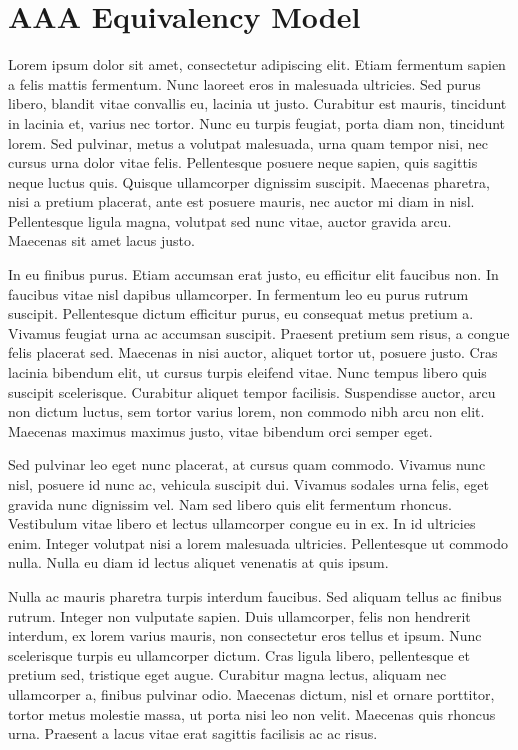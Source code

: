 \section{AAA Equivalency Model}
\label{sec:aaa_equivalency}

Lorem ipsum dolor sit amet, consectetur adipiscing elit. Etiam fermentum sapien a felis mattis fermentum. Nunc laoreet eros in malesuada ultricies. Sed purus libero, blandit vitae convallis eu, lacinia ut justo. Curabitur est mauris, tincidunt in lacinia et, varius nec tortor. Nunc eu turpis feugiat, porta diam non, tincidunt lorem. Sed pulvinar, metus a volutpat malesuada, urna quam tempor nisi, nec cursus urna dolor vitae felis. Pellentesque posuere neque sapien, quis sagittis neque luctus quis. Quisque ullamcorper dignissim suscipit. Maecenas pharetra, nisi a pretium placerat, ante est posuere mauris, nec auctor mi diam in nisl. Pellentesque ligula magna, volutpat sed nunc vitae, auctor gravida arcu. Maecenas sit amet lacus justo.

\vspace{2mm}

In eu finibus purus. Etiam accumsan erat justo, eu efficitur elit faucibus non. In faucibus vitae nisl dapibus ullamcorper. In fermentum leo eu purus rutrum suscipit. Pellentesque dictum efficitur purus, eu consequat metus pretium a. Vivamus feugiat urna ac accumsan suscipit. Praesent pretium sem risus, a congue felis placerat sed. Maecenas in nisi auctor, aliquet tortor ut, posuere justo. Cras lacinia bibendum elit, ut cursus turpis eleifend vitae. Nunc tempus libero quis suscipit scelerisque. Curabitur aliquet tempor facilisis. Suspendisse auctor, arcu non dictum luctus, sem tortor varius lorem, non commodo nibh arcu non elit. Maecenas maximus maximus justo, vitae bibendum orci semper eget.

\vspace{2mm}

Sed pulvinar leo eget nunc placerat, at cursus quam commodo. Vivamus nunc nisl, posuere id nunc ac, vehicula suscipit dui. Vivamus sodales urna felis, eget gravida nunc dignissim vel. Nam sed libero quis elit fermentum rhoncus. Vestibulum vitae libero et lectus ullamcorper congue eu in ex. In id ultricies enim. Integer volutpat nisi a lorem malesuada ultricies. Pellentesque ut commodo nulla. Nulla eu diam id lectus aliquet venenatis at quis ipsum.

\vspace{2mm}

Nulla ac mauris pharetra turpis interdum faucibus. Sed aliquam tellus ac finibus rutrum. Integer non vulputate sapien. Duis ullamcorper, felis non hendrerit interdum, ex lorem varius mauris, non consectetur eros tellus et ipsum. Nunc scelerisque turpis eu ullamcorper dictum. Cras ligula libero, pellentesque et pretium sed, tristique eget augue. Curabitur magna lectus, aliquam nec ullamcorper a, finibus pulvinar odio. Maecenas dictum, nisl et ornare porttitor, tortor metus molestie massa, ut porta nisi leo non velit. Maecenas quis rhoncus urna. Praesent a lacus vitae erat sagittis facilisis ac ac risus.


